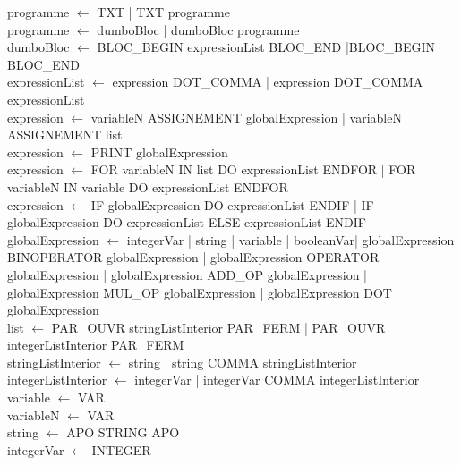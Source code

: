 ﻿\documentclass{report}
\begin{document}
programme $\leftarrow$ TXT | TXT programme\\

programme $\leftarrow$ dumboBloc | dumboBloc programme\\

dumboBloc $\leftarrow$ BLOC\_BEGIN expressionList BLOC\_END |BLOC\_BEGIN BLOC\_END\\

expressionList $\leftarrow$ expression DOT\_COMMA | expression DOT\_COMMA expressionList\\

expression $\leftarrow$ variableN ASSIGNEMENT globalExpression | variableN ASSIGNEMENT list\\

expression $\leftarrow$ PRINT globalExpression\\

expression $\leftarrow$ FOR variableN IN list DO expressionList ENDFOR | FOR variableN IN variable DO expressionList ENDFOR\\

expression $\leftarrow$ IF globalExpression DO expressionList ENDIF | IF globalExpression DO expressionList ELSE expressionList ENDIF\\

globalExpression $\leftarrow$ integerVar | string | variable | booleanVar| globalExpression BINOPERATOR globalExpression | globalExpression OPERATOR globalExpression | globalExpression ADD\_OP globalExpression | globalExpression MUL\_OP globalExpression | globalExpression DOT globalExpression\\

list $\leftarrow$ PAR\_OUVR stringListInterior PAR\_FERM | PAR\_OUVR integerListInterior PAR\_FERM\\

stringListInterior $\leftarrow$ string | string COMMA stringListInterior\\

integerListInterior $\leftarrow$ integerVar | integerVar COMMA integerListInterior\\

variable $\leftarrow$ VAR\\

variableN $\leftarrow$ VAR\\

string $\leftarrow$ APO STRING APO\\

integerVar $\leftarrow$ INTEGER\\
\end{document}

